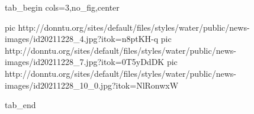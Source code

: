  
 
 
 
 

\ifcmt
  tab_begin cols=3,no_fig,center

     pic http://donntu.org/sites/default/files/styles/water/public/news-images/id20211228_4.jpg?itok=n8ptKH-q
		 pic http://donntu.org/sites/default/files/styles/water/public/news-images/id20211228_7.jpg?itok=0T5yDdDK
		 pic http://donntu.org/sites/default/files/styles/water/public/news-images/id20211228_10_0.jpg?itok=NlRonwxW

  tab_end
\fi
